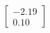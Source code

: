 \documentclass[preview]{standalone}
\begin{document}
\begin{align*}
\begin{bmatrix} -2.19 \\ 0.10 \end{bmatrix}
\end{align*}
\end{document}
